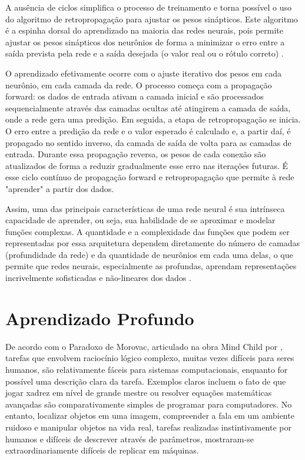 A ausência de ciclos simplifica o processo de treinamento e torna possível o uso do algoritmo de retropropagação para ajustar os pesos sinápticos. Este algoritmo é a espinha dorsal do aprendizado na maioria das redes neurais, pois permite ajustar os pesos sinápticos dos neurônios de forma a minimizar o erro entre a saída prevista pela rede e a saída desejada (o valor real ou o rótulo correto) \cite{rumelhart_learning_1986}. 

O aprendizado efetivamente ocorre com o ajuste iterativo dos pesos em cada neurônio, em cada camada da rede. O processo começa com a propagação forward: os dados de entrada ativam a camada inicial e são processados sequencialmente através das camadas ocultas até atingirem a camada de saída, onde a rede gera uma predição. Em seguida, a etapa de retropropagação se inicia. O erro entre a predição da rede e o valor esperado é calculado e, a partir daí, é propagado no sentido inverso, da camada de saída de volta para as camadas de entrada. Durante essa propagação reversa, os pesos de cada conexão são atualizados de forma a reduzir gradualmente esse erro nas iterações futuras. É esse ciclo contínuo de propagação forward e retropropagação que permite à rede "aprender" a partir dos dados.

Assim, uma das principais características de uma rede neural é sua intrínseca capacidade de aprender, ou seja, sua habilidade de se aproximar e modelar funções complexas. A quantidade e a complexidade das funções que podem ser representadas por essa arquitetura dependem diretamente do número de camadas (profundidade da rede) e da quantidade de neurônios em cada uma delas, o que permite que redes neurais, especialmente as profundas, aprendam representações incrivelmente sofisticadas e não-lineares dos dados \cite{mitchell_machine_2013}.

\section{Aprendizado Profundo}
\label{sec:aprendizado-de-maquina}

De acordo com o Paradoxo de Morovac, articulado na obra Mind Child por , tarefas que envolvem raciocínio lógico complexo, muitas vezes difíceis para seres humanos, são relativamente fáceis para sistemas computacionais, enquanto for possível uma descrição clara da tarefa. Exemplos claros incluem o fato de que jogar xadrez em nível de grande mestre ou resolver equações matemáticas avançadas são comparativamente simples de programar para computadores. No entanto, localizar objetos em uma imagem, compreender a fala em um ambiente ruidoso e manipular objetos na vida real, tarefas realizadas instintivamente por humanos e difíceis de descrever através de parâmetros, mostraram-se extraordinariamente difíceis de replicar em máquinas.

